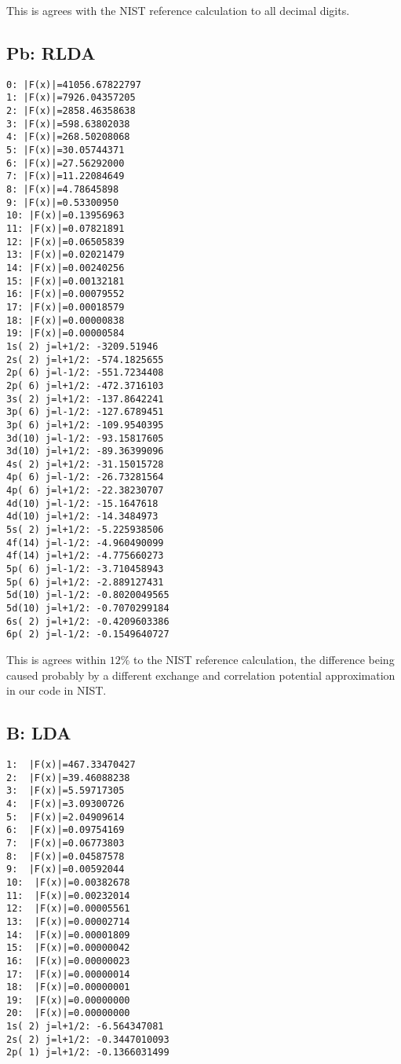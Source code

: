 This is agrees with the NIST reference calculation to all decimal digits.

\subsection{Pb: RLDA}

\begin{lstlisting}
0: |F(x)|=41056.67822797
1: |F(x)|=7926.04357205
2: |F(x)|=2858.46358638
3: |F(x)|=598.63802038
4: |F(x)|=268.50208068
5: |F(x)|=30.05744371
6: |F(x)|=27.56292000
7: |F(x)|=11.22084649
8: |F(x)|=4.78645898
9: |F(x)|=0.53300950
10: |F(x)|=0.13956963
11: |F(x)|=0.07821891
12: |F(x)|=0.06505839
13: |F(x)|=0.02021479
14: |F(x)|=0.00240256
15: |F(x)|=0.00132181
16: |F(x)|=0.00079552
17: |F(x)|=0.00018579
18: |F(x)|=0.00000838
19: |F(x)|=0.00000584
1s( 2) j=l+1/2: -3209.51946
2s( 2) j=l+1/2: -574.1825655
2p( 6) j=l-1/2: -551.7234408
2p( 6) j=l+1/2: -472.3716103
3s( 2) j=l+1/2: -137.8642241
3p( 6) j=l-1/2: -127.6789451
3p( 6) j=l+1/2: -109.9540395
3d(10) j=l-1/2: -93.15817605
3d(10) j=l+1/2: -89.36399096
4s( 2) j=l+1/2: -31.15015728
4p( 6) j=l-1/2: -26.73281564
4p( 6) j=l+1/2: -22.38230707
4d(10) j=l-1/2: -15.1647618
4d(10) j=l+1/2: -14.3484973
5s( 2) j=l+1/2: -5.225938506
4f(14) j=l-1/2: -4.960490099
4f(14) j=l+1/2: -4.775660273
5p( 6) j=l-1/2: -3.710458943
5p( 6) j=l+1/2: -2.889127431
5d(10) j=l-1/2: -0.8020049565
5d(10) j=l+1/2: -0.7070299184
6s( 2) j=l+1/2: -0.4209603386
6p( 2) j=l-1/2: -0.1549640727
\end{lstlisting}

This is agrees within $12\%$ to the NIST reference calculation, the difference
being caused probably by a different exchange and correlation potential
approximation in our code in NIST.

\subsection{B: LDA}

\begin{lstlisting}
1:  |F(x)|=467.33470427
2:  |F(x)|=39.46088238
3:  |F(x)|=5.59717305
4:  |F(x)|=3.09300726
5:  |F(x)|=2.04909614
6:  |F(x)|=0.09754169
7:  |F(x)|=0.06773803
8:  |F(x)|=0.04587578
9:  |F(x)|=0.00592044
10:  |F(x)|=0.00382678
11:  |F(x)|=0.00232014
12:  |F(x)|=0.00005561
13:  |F(x)|=0.00002714
14:  |F(x)|=0.00001809
15:  |F(x)|=0.00000042
16:  |F(x)|=0.00000023
17:  |F(x)|=0.00000014
18:  |F(x)|=0.00000001
19:  |F(x)|=0.00000000
20:  |F(x)|=0.00000000
1s( 2) j=l+1/2: -6.564347081
2s( 2) j=l+1/2: -0.3447010093
2p( 1) j=l+1/2: -0.1366031499
\end{lstlisting}

